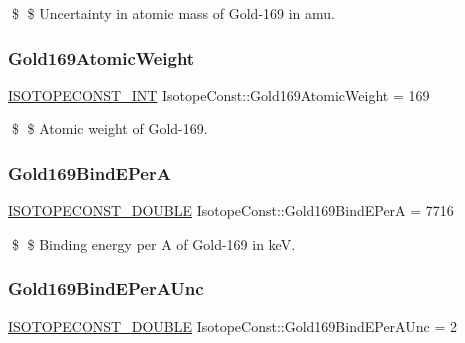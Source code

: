 \$ \$ Uncertainty in atomic mass of Gold-\/169 in amu. \mbox{\label{group___isotope_const-_gold-_au169_gacc3a148b7342307b361115ccb1278132}} 
\subsubsection{\texorpdfstring{Gold169\+Atomic\+Weight}{Gold169AtomicWeight}}
{\footnotesize\ttfamily \mbox{\hyperlink{group___isotope_const-_macros_ga5f18360b3e99483a35c32d789e62621c}{I\+S\+O\+T\+O\+P\+E\+C\+O\+N\+S\+T\+\_\+\+I\+NT}} Isotope\+Const\+::\+Gold169\+Atomic\+Weight = 169}

\$ \$ Atomic weight of Gold-\/169. \mbox{\label{group___isotope_const-_gold-_au169_ga8abc6f24b75f3edd566a0cc9ea059181}} 
\subsubsection{\texorpdfstring{Gold169\+Bind\+E\+PerA}{Gold169BindEPerA}}
{\footnotesize\ttfamily \mbox{\hyperlink{group___isotope_const-_macros_ga8f45a7272ce02c0b4c65c44636ed719a}{I\+S\+O\+T\+O\+P\+E\+C\+O\+N\+S\+T\+\_\+\+D\+O\+U\+B\+LE}} Isotope\+Const\+::\+Gold169\+Bind\+E\+PerA = 7716}

\$ \$ Binding energy per A of Gold-\/169 in keV. \mbox{\label{group___isotope_const-_gold-_au169_gaa20585686fed603a8f11d1d367d6dcc3}} 
\subsubsection{\texorpdfstring{Gold169\+Bind\+E\+Per\+A\+Unc}{Gold169BindEPerAUnc}}
{\footnotesize\ttfamily \mbox{\hyperlink{group___isotope_const-_macros_ga8f45a7272ce02c0b4c65c44636ed719a}{I\+S\+O\+T\+O\+P\+E\+C\+O\+N\+S\+T\+\_\+\+D\+O\+U\+B\+LE}} Isotope\+Const\+::\+Gold169\+Bind\+E\+Per\+A\+Unc = 2}

